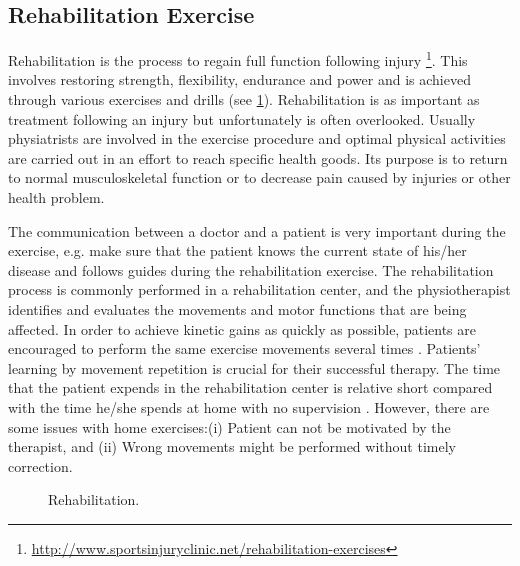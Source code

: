 \subsection{Rehabilitation Exercise}
Rehabilitation is the process to regain full function following injury \footnote{\url{http://www.sportsinjuryclinic.net/rehabilitation-exercises}}. This involves restoring strength, flexibility, endurance and power and is achieved through various exercises and drills (see \figurename{ \ref{fig:2-bg:rehabilitation}}). Rehabilitation is as important as treatment following an injury but unfortunately is often overlooked. Usually physiatrists are involved in the exercise procedure and optimal physical activities are carried out in an effort to reach specific health goods. Its purpose is to return to normal musculoskeletal function or to decrease pain caused by injuries or other health problem. 

The communication between a doctor and a patient is very important during the exercise, e.g. make sure that the patient knows the current state of his/her disease and follows guides during the rehabilitation exercise. The rehabilitation process is commonly performed in a rehabilitation center, and the physiotherapist identifies and evaluates the movements and motor functions that are being affected. In order to achieve kinetic gains as quickly as possible, patients are encouraged to perform the same exercise movements several times \cite{Metcalf2013}. Patients' learning by movement repetition is crucial for their successful therapy. The time that the patient expends in the rehabilitation center is relative short compared with the time he/she spends at home with no supervision \cite{Crocher2013}. However, there are some issues with home exercises:(i) Patient can not be motivated by the therapist, and (ii) Wrong movements might be performed without timely correction.

\begin{figure}
	\centering
	\qquad
	\caption{Rehabilitation.}
	\label{fig:2-bg:rehabilitation}
\end{figure}

